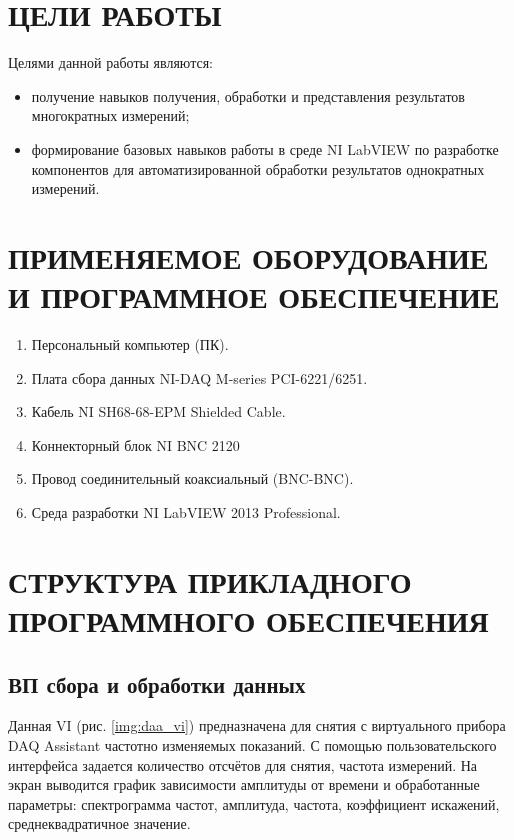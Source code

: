 \documentclass[a4paper,14pt]{article}
\begin{document}

\tableofcontents
\pagebreak

\section{ЦЕЛИ РАБОТЫ}
Целями данной работы являются:

\begin{itemize}
    \item получение навыков получения, обработки и представления результатов многократных измерений;
    \item формирование базовых навыков работы в среде NI LabVIEW по разработке компонентов для автоматизированной обработки результатов однократных измерений.
\end{itemize}

\section{ПРИМЕНЯЕМОЕ ОБОРУДОВАНИЕ И ПРОГРАММНОЕ ОБЕСПЕЧЕНИЕ}

\begin{enumerate}
    \item    Персональный компьютер (ПК).
    \item    Плата сбора данных NI-DAQ M-series PCI-6221/6251.
    \item    Кабель NI SH68-68-EPM Shielded Cable.
    \item    Коннекторный блок NI BNC 2120
    \item    Провод соединительный коаксиальный (BNC-BNC).
    \item    Среда разработки NI LabVIEW 2013 Professional.
\end{enumerate}


\section{СТРУКТУРА ПРИКЛАДНОГО     ПРОГРАММНОГО ОБЕСПЕЧЕНИЯ}
\subsection{ВП сбора и обработки данных}

Данная VI (рис. \ref{img:daa_vi}) предназначена для снятия с виртуального прибора DAQ Assistant частотно изменяемых показаний.
С помощью пользовательского интерфейса задается количество отсчётов для снятия, частота измерений.
На экран выводится график зависимости амплитуды от времени и обработанные параметры: спектрограмма частот, амплитуда, частота, коэффициент искажений, среднеквадратичное значение.
\end{document}
